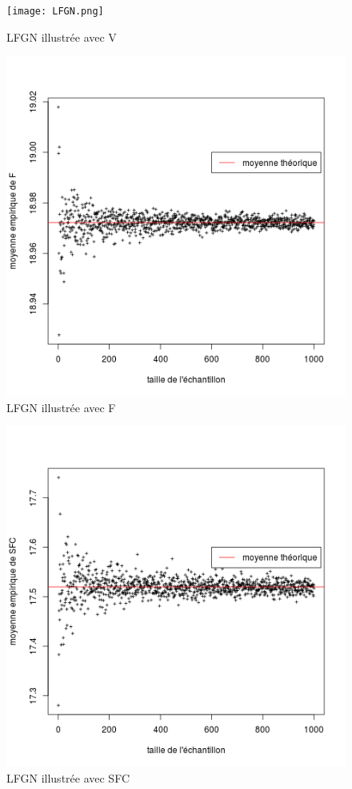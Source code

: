 \documentclass{article}
\begin{document}
\begin{figure}[!h]
\begin{center}
    \texttt{[image: LFGN.png]}
    \caption{LFGN illustrée avec V}
    \label{LFGN_V}
\end{center}
\end{figure}
\begin{figure}[!h]
\begin{center}
    \includegraphics[scale=0.7]{LFGN_F.png}
    \caption{LFGN illustrée avec F}
    \label{LFGN_F}
\end{center}
\end{figure}
\begin{figure}[!h]
\begin{center}
    \includegraphics[scale=0.7]{LFGN_SFC.png}
    \caption{LFGN illustrée avec SFC}
    \label{LFGN_SFC}
\end{center}
\end{figure}
\end{document}

